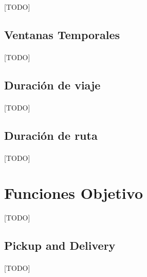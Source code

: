 \documentclass{subfiles}
\begin{document}
      \paragraph{}
      [TODO]

      \subsection{Ventanas Temporales}
      \label{sec:formulation_time_window_restrictions}

        \paragraph{}
        [TODO]

      \subsection{Duración de viaje}
      \label{sec:formulation_trip_duration_restrictions}

        \paragraph{}
        [TODO]

      \subsection{Duración de ruta}
      \label{sec:formulation_route_duration_restrictions}

        \paragraph{}
        [TODO]

    \section{Funciones Objetivo}
    \label{sec:formulation_objective_functions}
      [TODO]

      \subsection{Pickup and Delivery}
      \label{sec:formulation_pickup_and_delivery}

        \paragraph{}
        [TODO]
\end{document}
